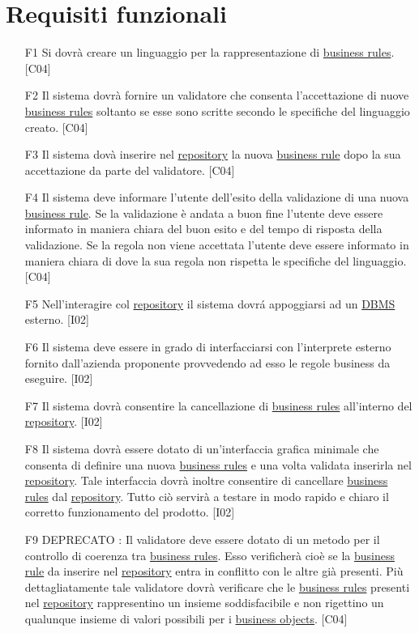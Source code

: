 \section{Requisiti funzionali}
\begin{itemize}
\item[F1]{Si dovr\`a creare un linguaggio per la rappresentazione di \underline{business rules}. [C04]}
\item[F2]{Il sistema dovr\`a fornire un validatore che consenta l'accettazione di nuove \underline{business rules} soltanto se esse sono scritte secondo le specifiche del linguaggio creato. [C04]}
\item[F3]{Il sistema dov\`a inserire nel \underline{repository} la nuova \underline{business rule} dopo la sua accettazione da parte del validatore. [C04]}
\item[F4]{Il sistema deve informare l'utente dell'esito della validazione di una nuova \underline{business rule}. Se la validazione \`e andata a buon fine l'utente deve essere informato in maniera chiara del buon esito e del tempo di risposta della validazione. Se la regola non viene accettata l'utente deve essere informato in maniera chiara di dove la sua regola non rispetta le specifiche del linguaggio. [C04]}
\item[F5]{Nell'interagire col \underline{repository} il sistema dovr\'a appoggiarsi ad un \underline{DBMS} esterno. [I02]}
\item[F6]{Il sistema deve essere in grado di interfacciarsi con l'interprete esterno fornito dall'azienda proponente provvedendo ad esso le regole business da eseguire. [I02]}
\item[F7]{Il sistema dovr\`a consentire la cancellazione di \underline{business rules} all'interno del \underline{repository}. [I02]}
\item[F8]{Il sistema dovr\`a essere dotato di un'interfaccia grafica minimale che consenta di definire una nuova \underline{business rules} e una volta validata inserirla nel \underline{repository}. Tale interfaccia dovr\`a inoltre consentire di cancellare \underline{business rules} dal \underline{repository}. Tutto ci\`o servir\`a a testare in modo rapido e chiaro il corretto funzionamento del prodotto. [I02]}
\item[F9]{ DEPRECATO : Il validatore deve essere dotato di un metodo per il controllo di coerenza tra \underline{business rules}. Esso verificher\`a cio\`e se la \underline{business rule} da inserire nel \underline{repository} entra in conflitto con le altre gi\`a presenti. Pi\`u dettagliatamente tale validatore dovr\`a verificare che le \underline{business rules} presenti nel \underline{repository} rappresentino un insieme soddisfacibile e non rigettino un qualunque insieme di valori possibili per i \underline{business objects}. [C04]
}
\end{itemize}
